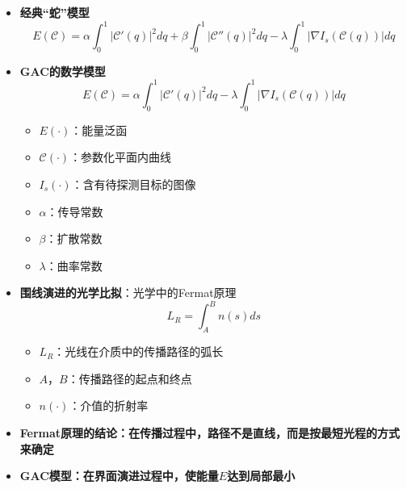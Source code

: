\begin{frame}
\begin{itemize}
\item \textbf{经典“蛇”模型}
\begin{equation*}
E(\mathcal{C}) = \alpha \int_0^1 | \mathcal{C}'(q) |^2 dq + \beta \int_0^1 | \mathcal{C}''(q) |^2 dq - \lambda \int_0^1 | \nabla I_{s} ( \mathcal{C}(q) ) |dq
\end{equation*}
\pause \item \textbf{GAC的数学模型}
\begin{equation*}
E(\mathcal{C}) = \alpha \int_0^1 | \mathcal{C}'(q) |^2 dq - \lambda \int_0^1 | \nabla I_{s} ( \mathcal{C}(q) ) |dq
\end{equation*}
\begin{itemize}
\item $E(\cdot)$：能量泛函
\item $\mathcal{C}(\cdot)$：参数化平面内曲线
\item $I_{s}(\cdot)$：含有待探测目标的图像
\item $\alpha$：传导常数
\item $\beta$：扩散常数
\item $\lambda$：曲率常数
\end{itemize}
\end{itemize}
\end{frame}

\begin{frame}
\begin{itemize}
 \item \textbf{围线演进的光学比拟}：光学中的Fermat原理
\begin{equation*}
L_{R} = \int_{A}^{B} n(s) ds
\end{equation*}
\begin{itemize}
\item $L_{R}$：光线在介质中的传播路径的弧长
\item $A$，$B$：传播路径的起点和终点
\item $n(\cdot)$：介值的折射率
\end{itemize}
 \item \textbf{Fermat原理的结论：在传播过程中，路径不是直线，而是按最短光程的方式来确定}
 \item \textbf{GAC模型：在界面演进过程中，使能量$E$达到局部最小}
\end{itemize}
\end{frame}

